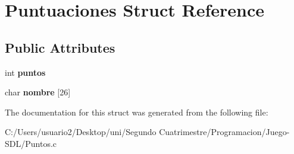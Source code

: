 \hypertarget{struct_puntuaciones}{}\section{Puntuaciones Struct Reference}
\label{struct_puntuaciones}
\subsection*{Public Attributes}
\begin{DoxyCompactItemize}
\item 
int {\bfseries puntos}\hypertarget{struct_puntuaciones_a4661e5b2c08f1eaf08c50d4c4ea4e77e}{}\label{struct_puntuaciones_a4661e5b2c08f1eaf08c50d4c4ea4e77e}

\item 
char {\bfseries nombre} \mbox{[}26\mbox{]}\hypertarget{struct_puntuaciones_a9fcaa027c6b67cabc20c0d64180f747c}{}\label{struct_puntuaciones_a9fcaa027c6b67cabc20c0d64180f747c}

\end{DoxyCompactItemize}


The documentation for this struct was generated from the following file\+:\begin{DoxyCompactItemize}
\item 
C\+:/\+Users/usuario2/\+Desktop/uni/\+Segundo Cuatrimestre/\+Programacion/\+Juego-\/\+S\+D\+L/Puntos.\+c\end{DoxyCompactItemize}
